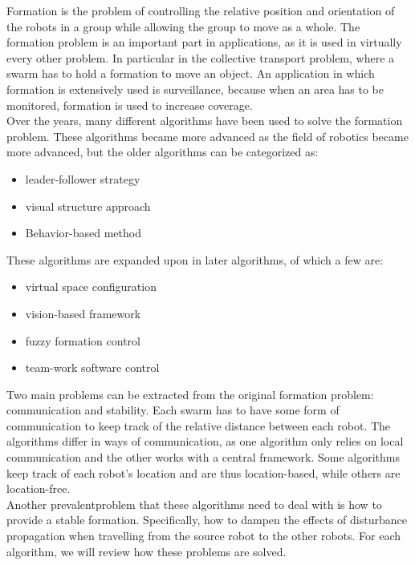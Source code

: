 
Formation is the problem of controlling the relative position and orientation of the robots in a group while allowing the group to move as a whole. \cite{consolini}
The formation problem is an important part in applications, as it is used in virtually every other problem. 
In particular in the collective transport problem, where a swarm has to hold a formation to move an object. 
An application in which formation is extensively used is surveillance, because when an area has to be monitored, formation is used to increase coverage. \cite{burkle2011} \\

Over the years, many different algorithms have been used to solve the formation problem. \cite{chen2005}
These algorithms became more advanced as the field of robotics became more advanced, but the older algorithms can be categorized as:

\begin{itemize}
	\item leader-follower strategy \cite{consoline2007}
	\item visual structure approach \cite{ren}
	\item Behavior-based method \cite{balch1998}
\end{itemize}

These algorithms are expanded upon in later algorithms, of which a few are:

\begin{itemize}
	\item virtual space configuration \cite{Wee}
	\item vision-based framework \cite{Das}
	\item fuzzy formation control \cite{Ranjbar-Sahraei}
	\item team-work software control \cite{Kaminka}
\end{itemize}

Two main problems can be extracted from the original formation problem: communication and stability. 
Each swarm has to have some form of communication to keep track of the relative distance between each robot. 
The algorithms differ in ways of communication, as one algorithm only relies on local communication and the other works with a central framework.
Some algorithms keep track of each robot's location and are thus location-based, while others are location-free. \\

Another prevalentproblem that these algorithms need to deal with is how to provide a stable formation. 
Specifically, how to dampen the effects of disturbance propagation when travelling from the source robot to the other robots. 
For each algorithm, we will review how these problems are solved. 